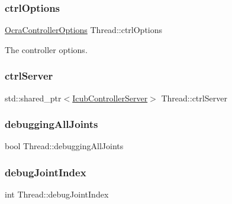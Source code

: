 \subsubsection{\texorpdfstring{ctrl\+Options}{ctrlOptions}}
{\footnotesize\ttfamily \hyperlink{classOcraControllerOptions}{Ocra\+Controller\+Options} Thread\+::ctrl\+Options\hspace{0.3cm}{\ttfamily [private]}}

The controller options. \hypertarget{classThread_ace1179249de64e545f43dc48529fbbb6}{}\label{classThread_ace1179249de64e545f43dc48529fbbb6} 
\subsubsection{\texorpdfstring{ctrl\+Server}{ctrlServer}}
{\footnotesize\ttfamily std\+::shared\+\_\+ptr$<$\hyperlink{classIcubControllerServer}{Icub\+Controller\+Server}$>$ Thread\+::ctrl\+Server\hspace{0.3cm}{\ttfamily [private]}}

\hypertarget{classThread_aba345996b91a57d9e1f2dd15c7c75e08}{}\label{classThread_aba345996b91a57d9e1f2dd15c7c75e08} 
\subsubsection{\texorpdfstring{debugging\+All\+Joints}{debuggingAllJoints}}
{\footnotesize\ttfamily bool Thread\+::debugging\+All\+Joints\hspace{0.3cm}{\ttfamily [private]}}

\hypertarget{classThread_aedf960b8e991868561f35193702245b0}{}\label{classThread_aedf960b8e991868561f35193702245b0} 
\subsubsection{\texorpdfstring{debug\+Joint\+Index}{debugJointIndex}}
{\footnotesize\ttfamily int Thread\+::debug\+Joint\+Index\hspace{0.3cm}{\ttfamily [private]}}

\hypertarget{classThread_a9bd7f6aebc0be4709f32f95aa32f1add}{}\label{classThread_a9bd7f6aebc0be4709f32f95aa32f1add} 
